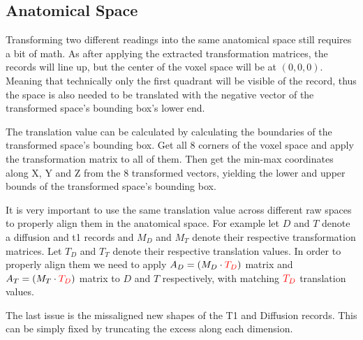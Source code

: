 \subsection{Anatomical Space}
Transforming two different readings into the same anatomical space still requires a bit of math. As after applying the extracted transformation matrices, the records will line up, but the center of the voxel space will be at $(0,0,0)$. Meaning that technically only the first quadrant will be visible of the record, thus the space is also needed to be translated with the negative vector of the transformed space's bounding box's lower end.\par
The translation value can be calculated by calculating the boundaries of the transformed space's bounding box. Get all 8 corners of the voxel space and apply the transformation matrix to all of them. Then get the min-max coordinates along X, Y and Z from the 8 transformed vectors, yielding the lower and upper bounds of the transformed space's bounding box.\par
It is very important to use the same translation value across different raw spaces to properly align them in the anatomical space. For example let $D$ and $T$ denote a diffusion and t1 records and $M_D$ and $M_T$ denote their respective transformation matrices. Let $T_D$ and $T_T$ denote their respective translation values. In order to properly align them we need to apply $A_D = (M_D \cdot {\color{red}T_D})$ matrix and $A_T = (M_T \cdot {\color{red}T_D})$ matrix to $D$ and $T$ respectively, with matching ${\color{red}T_D}$ translation values.\par
The last issue is the missaligned new shapes of the T1 and Diffusion records. This can be simply fixed by truncating the excess along each dimension.

